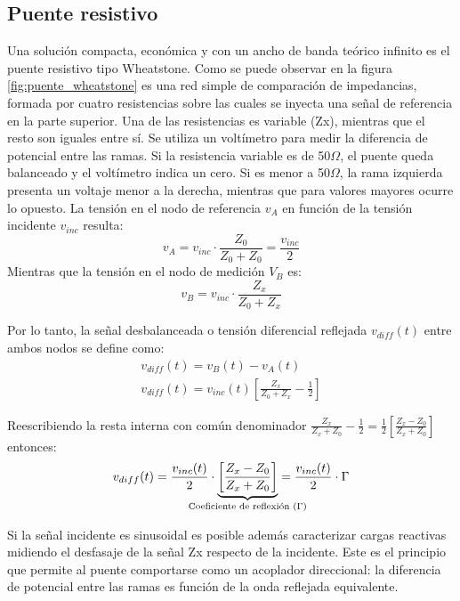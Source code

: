 \subsection{Puente resistivo}
Una solución compacta, económica y con un ancho de banda teórico infinito es el puente resistivo tipo Wheatstone. Como se puede observar en la figura \ref{fig:puente_wheatstone} es una red simple de comparación de impedancias, formada por cuatro resistencias sobre las cuales se inyecta una señal de referencia en la parte superior. Una de las resistencias es variable (Zx), mientras que el resto son iguales entre sí. Se utiliza un voltímetro para medir la diferencia de potencial entre las ramas. Si la resistencia variable es de 50$\Omega$, el puente queda balanceado y el voltímetro indica un cero. Si es menor a 50$\Omega$, la rama izquierda presenta un voltaje menor a la derecha, mientras que para valores mayores ocurre lo opuesto.
La tensión en el nodo de referencia $v_A$ en función de la tensión incidente $v_{inc}$ resulta:
\begin{equation} 
    v_{A} = v_{inc} \cdot \frac{Z_{0}}{Z_{0} + Z_{0}} = \frac{v_{inc}}{2}
\end{equation}
Mientras que la tensión en el nodo de medición $V_B$ es: \begin{equation} 
    v_B = v_{inc} \cdot \frac{Z_{x}}{Z_{0} + Z_{x}} 
\end{equation}

Por lo tanto, la señal desbalanceada o tensión diferencial reflejada $v_{diff}(t)$ entre ambos nodos se define como: 
\begin{subequations} 
    \begin{align}
        v_{diff}(t) = v_{B}(t) - v_{A}(t) \\
        v_{diff}(t) = v_{inc}(t) \left[ \frac{Z_{x}}{Z_{0} + Z_{x}} - \frac{1}{2} \right] 
    \end{align} 
\end{subequations} 

Reescribiendo la resta interna con común denominador $\frac{Z_{x}}{Z_{x} + Z_{0}} - \frac{1}{2} = \frac{1}{2}\left[\frac{Z_{x} - Z_{0}}{Z_{x} + Z_{0}}\right]$ entonces: 
\begin{equation}
    v_{diff}(t) =
    \frac{v_{inc}(t)}{2} \cdot
    \underbrace{
        \left[\frac{Z_x-Z_0}{Z_x+Z_0}\right]
    }_{\mathclap{\text{Coeficiente de reflexión }(\Gamma)}}
    = \frac{v_{inc}(t)}{2}\cdot\Gamma
\end{equation}

Si la señal incidente es sinusoidal es posible además caracterizar cargas reactivas midiendo el desfasaje de la señal Zx respecto de la incidente. Este es el principio que permite al puente comportarse como un acoplador direccional: la diferencia de potencial entre las ramas es función de la onda reflejada equivalente.  

